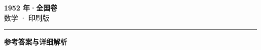 \documentclass[zihao=5, a4paper]{ctexart}
\begin{document}
\begin{center}
  {\Large\bfseries 1952 年·全国卷}\\[4pt]
  {\large 数学 · 印刷版}
\end{center}
\medskip
{}

\par\bigskip\hrule\bigskip
{}
\begin{center}{\large\bfseries 参考答案与详细解析}\end{center}
\smallskip

\end{document}
